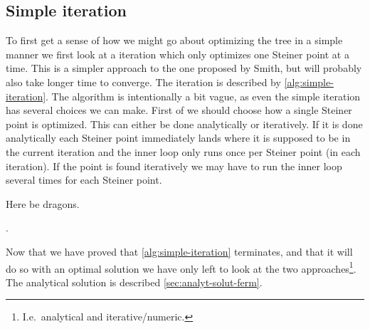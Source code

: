 
\subsection{Simple iteration}
\label{sec:simple-iteration}

To first get a sense of how we might go about optimizing the tree in a simple
manner we first look at a iteration which only optimizes one Steiner point at a
time.  This is a simpler approach to the one proposed by Smith, but will probably
also take longer time to converge.  The iteration is described by
\cref{alg:simple-iteration}.  The algorithm is intentionally a bit vague, as even
the simple iteration has several choices we can make.  First of we should choose
how a single Steiner point is optimized.  This can either be done
analytically or iteratively.  If it is done
analytically each Steiner point immediately lands where it is supposed to be in
the current iteration and the inner loop only runs once per Steiner point (in
each iteration).  If the point is found iteratively we may have to run the inner
loop several times for each Steiner point.

\begin{algorithm}[htbp]
  \caption{Here be dragons.\label{alg:simple-iteration}}
\end{algorithm}

.

Now that we have proved that \cref{alg:simple-iteration} terminates, and that it
will do so with an optimal solution we have only left to look at the two
approaches\footnote{I.e.\ analytical and iterative/numeric.}.  The analytical
solution is described \cref{sec:analyt-solut-ferm}.

